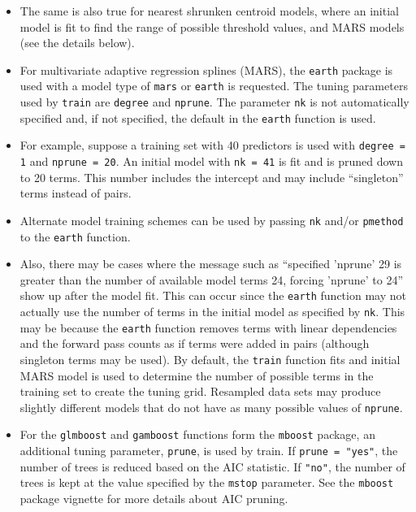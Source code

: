 \documentclass[12pt]{article}
\begin{document}
\begin{itemize}
	\item [] The same is also true for nearest shrunken centroid models, where an initial model is fit to find the range of possible threshold values, and MARS models (see the details below).
	
  \item For multivariate adaptive regression splines (MARS), the \texttt{earth} package is used with a model type of \texttt{mars} or \texttt{earth} is requested. The tuning parameters used by \texttt{train} are \texttt{degree} and \texttt{nprune}. The parameter \texttt{nk} is not automatically specified and, if not specified, the default in the \texttt{earth} function is used. 

  \item [] For example, suppose a training set with 40 predictors is used with \texttt{degree = 1} and \texttt{nprune = 20}. An initial model with \texttt{nk = 41} is fit and is pruned down to 20 terms. This number includes the intercept and may include ``singleton'' terms instead of pairs. 

  \item [] Alternate model training schemes can be used by passing \texttt{nk} and/or \texttt{pmethod} to the \texttt{earth} function.

  \item [] Also, there may be cases where the message such as ``specified 'nprune' 29 is greater than the number of available model terms 24, forcing 'nprune' to 24'' show up after the model fit. This can occur since the \texttt{earth} function may not actually use the number of terms in the initial model as specified by \texttt{nk}. This may be because the \texttt{earth} function removes terms with linear dependencies and  the forward pass counts as if terms were added in pairs (although singleton terms may be used). By default, the \texttt{train} function fits and initial MARS model is used to determine the number of possible terms in the training set to create the tuning grid. Resampled data sets may produce slightly different models that do not have as many possible values of  \texttt{nprune}.
	
   \item For the \texttt{glmboost} and \texttt{gamboost} functions form the \texttt{mboost} package, an additional tuning parameter, \texttt{prune}, is used by train. If \texttt{prune = "yes"}, the number of trees is reduced based on the AIC statistic. If \texttt{"no"}, the number of trees is kept at the value specified by the \texttt{mstop} parameter. See the \texttt{mboost} package vignette for more details about AIC pruning.	


\end{itemize}
\end{document}
